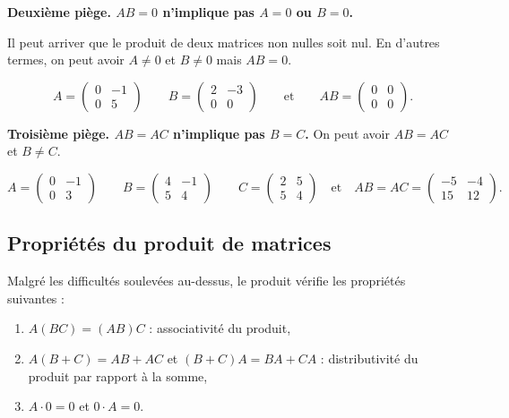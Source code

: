 \documentclass[class=report,crop=false]{standalone}
\begin{document}
\bigskip

\textbf{Deuxième piège. $AB=0$ n'implique pas $A=0$ ou $B=0$.}

Il peut arriver que le produit de deux matrices non nulles soit nul.
En d'autres termes, on peut avoir $A \neq 0$ et $B \neq 0$ mais $AB  =  0$.
\begin{exemple}
$$
A  = \begin{pmatrix}
 0 & -1\\
 0 & 5\end{pmatrix}\qquad B  =
\begin{pmatrix}
2 & -3\\
0 & 0 \end{pmatrix}
\qquad \text{et} \qquad
 AB  =  \begin{pmatrix}
 0 & 0\\
 0 & 0\end{pmatrix}.
$$
\end{exemple}

\bigskip


\textbf{Troisième piège. $AB=AC$ n'implique pas $B=C$.}
On peut avoir $AB  = AC$ et $B \neq C$.

\begin{exemple}
$$
 A  =  \begin{pmatrix}
 0 & -1\\
 0 & 3\end{pmatrix}
 \qquad
 B  = \begin{pmatrix}
4 & -1\\
5 & 4 \end{pmatrix}
 \qquad
 C  = \begin{pmatrix}
 2 & 5\\
 5 & 4\end{pmatrix}
 \quad  \text{et}  \quad
 AB  = AC = \begin{pmatrix}
  -5 & -4\\
  15 & 12\end{pmatrix}.
$$
\end{exemple}

\subsection{Propriétés du produit de matrices}

Malgré les difficultés soulevées au-dessus, le produit vérifie les propriétés suivantes :
\begin{proposition}
\sauteligne
\begin{enumerate}
  \item $A (BC) = (AB) C$ : associativité du produit,

  \item $A(B+C) = AB + AC$ \quad et \quad  $(B+C) A = BA + CA$ : distributivité du produit par rapport à la somme,

  \item $A\cdot 0 = 0$ \quad et \quad $0\cdot A= 0$.
\end{enumerate}
\end{proposition}
\end{document}
